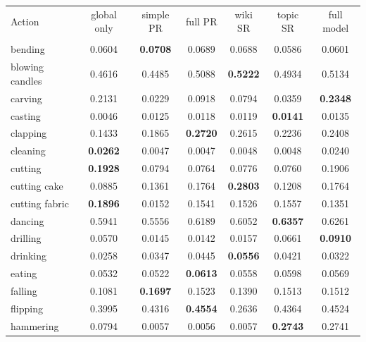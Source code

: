 \documentclass[10pt,twocolumn,letterpaper]{article}
\begin{document}
\setlength{\tabcolsep}{2.5pt}
\begin{table}
\begin{center}
\scalebox{0.9}
{\footnotesize
\begin{tabular}{|l|c|c|c|c|c|c|}
\hline
{Action} & global only & simple PR & full PR & wiki SR & topic SR & full model \\
& & & & \cite{Rohrbach_CVPR10} & & \\
  \hline \hline
bending & 0.0604 & \textbf{0.0708} & 0.0689 & 0.0688 & 0.0586 & 0.0601 \\ 
blowing candles & 0.4616 & 0.4485 & 0.5088 & \textbf{0.5222} & 0.4934 & 0.5134 \\ 
carving & 0.2131 & 0.0229 & 0.0918 & 0.0794 & 0.0359 & \textbf{0.2348} \\ 
casting & 0.0046 & 0.0125 & 0.0118 & 0.0119 & \textbf{0.0141} & 0.0135 \\ 
clapping & 0.1433 & 0.1865 & \textbf{0.2720} & 0.2615 & 0.2236 & 0.2408 \\ 
cleaning & \textbf{0.0262} & 0.0047 & 0.0047 & 0.0048 & 0.0048 & 0.0240 \\ 
cutting & \textbf{0.1928} & 0.0794 & 0.0764 & 0.0776 & 0.0760 & 0.1906 \\ 
cutting cake & 0.0885 & 0.1361 & 0.1764 & \textbf{0.2803} & 0.1208 & 0.1764 \\ 
cutting fabric & \textbf{0.1896} & 0.0152 & 0.1541 & 0.1526 & 0.1557 & 0.1351 \\ 
dancing & 0.5941 & 0.5556 & 0.6189 & 0.6052 & \textbf{0.6357} & 0.6261 \\ 
drilling & 0.0570 & 0.0145 & 0.0142 & 0.0157 & 0.0661 & \textbf{0.0910} \\ 
drinking & 0.0258 & 0.0347 & 0.0445 & \textbf{0.0556} & 0.0421 & 0.0322 \\ 
eating & 0.0532 & 0.0522 & \textbf{0.0613} & 0.0558 & 0.0598 & 0.0569 \\ 
falling & 0.1081 & \textbf{0.1697} & 0.1523 & 0.1390 & 0.1513 & 0.1512 \\ 
flipping & 0.3995 & 0.4316 & \textbf{0.4554} & 0.2636 & 0.4364 & 0.4524 \\ 
hammering & 0.0794 & 0.0057 & 0.0056 & 0.0057 & \textbf{0.2743} & 0.2741 \\ 

\end{tabular}}
\end{center}
\end{table}
\end{document}
